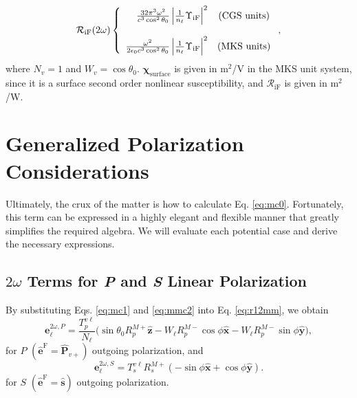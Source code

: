 \documentclass[aps,pra,10pt,amsmath,notitlepage,letterpaper]{revtex4-1}
\begin{document}
\begin{equation}\label{eq:mc6}
\mathcal{R}_{\mathrm{iF}}(2\omega) 
\left\{
\begin{array}{ r c } 
\frac{32\pi^{3}\omega^{2}}{c^{3}\cos^{2}\theta_{0}}
\left\vert\frac{1}{n_{\ell}}\Upsilon_{\mathrm{iF}}\right\vert^{2} 
& \text{(CGS units)} \\\\
\frac{\omega^{2}}{2\epsilon_{0}c^3\cos^{2}\theta_{0}}
\left\vert\frac{1}{n_{\ell}}\Upsilon_{\mathrm{iF}}\right\vert^{2} 
& \text{(MKS units)} 
\end{array}
\right.,
\end{equation}
where $N_{v}=1$ and $W_{v}=\cos\theta_{0}$.
$\boldsymbol{\chi}_{\mathrm{surface}}$ is given in m$^{2}$/V in the MKS unit
system, since it is a surface second order nonlinear susceptibility, and
$\mathcal{R}_{\mathrm{iF}}$ is given in m$^2$/W.



\section{Generalized Polarization Considerations}

Ultimately, the crux of the matter is how to calculate Eq. \eqref{eq:mc0}.
Fortunately, this term can be expressed in a highly elegant and flexible manner
that greatly simplifies the required algebra. We will evaluate each potential
case and derive the necessary expressions.



\subsection{\texorpdfstring{$2\omega$}{2w} Terms for \emph{P} and \emph{S}
Linear Polarization}

By substituting Eqs. \eqref{eq:mc1} and \eqref{eq:mmc2} into Eq.
\eqref{eq:r12mm}, we obtain
\begin{equation}\label{eq:e2wpmr}
\mathbf{e}^{2\omega,P}_{\ell} =
\frac{T^{v\ell}_{p}}{N_{\ell}}
\big(
  \sin\theta_{0}R^{M+}_{p}\hat{\mathbf{z}}
- W_{\ell}R^{M-}_{p}\cos\phi\hat{\mathbf{x}}
- W_{\ell}R^{M-}_{p}\sin\phi\hat{\mathbf{y}}
\big),
\end{equation}
for $P$ $(\hat{\mathbf{e}}^{\mathrm{F}} = \hat{\mathbf{P}}_{v+})$ outgoing
polarization, and
\begin{equation}\label{eq:e2wsmr}
\mathbf{e}^{2\omega,S}_{\ell} =
T_{s}^{v\ell}R^{M+}_{s}
\left(
- \sin\phi\hat{\mathbf{x}}
+ \cos\phi\hat{\mathbf{y}}
\right).
\end{equation}
for $S$ $(\hat{\mathbf{e}}^{\mathrm{F}}=\hat{\mathbf{s}})$ outgoing
polarization.
\end{document}
